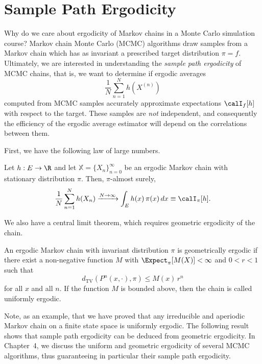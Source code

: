\section{Sample Path Ergodicity}
\label{sec:A.6}

Why do we care about ergodicity of Markov chains in a Monte Carlo simulation course?  Markov chain
Monte Carlo (MCMC) algorithms draw samples from a Markov chain which has as invariant a prescribed
target distribution $\pi = f$.  Ultimately, we are interested in understanding the \emph{sample
path ergodicity} of MCMC chains, that is, we want to determine if ergodic averages
\[
  \frac{1}{N} \sum_{n=1}^{N} h(X^{(n)})
\]
computed from MCMC samples accurately approximate expectations $\calI_f[h]$ with respect to the
target.  These samples are \emph{not} independent, and consequently the efficiency of the ergodic
average estimator will depend on the correlations between them.

First, we have the following law of large numbers.

\begin{theorem}
\label{thm:A.32}
Let $h : E \to \R$ and let $\mathbb{X} = \{X_n\}_{n=0}^\infty$ be an ergodic Markov chain with
stationary distribution $\pi$.  Then, $\pi$-almost surely,
\[
  \frac{1}{N} \sum_{n=1}^{N} h(X_n) \xrightarrow{N \to \infty} \int_E h(x)\, \pi(x)\, dx
  \equiv \calI_\pi[h].
\]
\end{theorem}

We also have a central limit theorem, which requires geometric ergodicity of the chain.

\begin{definition}
\label{def:A.33}
An ergodic Markov chain with invariant distribution $\pi$ is geometrically ergodic if there exist
a non-negative function $M$ with $\Expect_\pi[M(X)] < \infty$ and $0 < r < 1$ such that
\[
  d_{\mathrm{TV}}(P^n(x, \cdot), \pi) \leq M(x)\, r^n
\]
for all $x$ and all $n$.  If the function $M$ is bounded above, then the chain is called
uniformly ergodic.
\end{definition}

Note, as an example, that we have proved that any irreducible and aperiodic Markov chain on a
finite state space is uniformly ergodic.  The following result shows that sample path ergodicity
can be deduced from geometric ergodicity.  In Chapter~4, we discuss the uniform and geometric
ergodicity of several MCMC algorithms, thus guaranteeing in particular their sample path
ergodicity.

